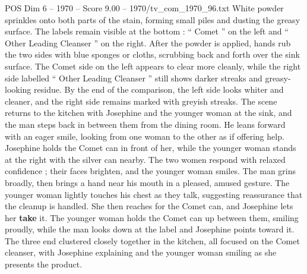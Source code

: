 \begin{textsample}{POS Dim 6 – 1970 – Score 9.00 – 1970/tv\_com\_1970\_96.txt}
White powder sprinkles onto both parts of the stain, forming small piles and dusting the greasy surface.
The labels remain visible at the bottom : “ Comet ” on the left and “ Other Leading Cleanser ” on the right.
After the powder is applied, hands rub the two sides with blue sponges or cloths, scrubbing back and forth over the sink surface.
The Comet side on the left appears to clear more cleanly, while the right side labelled “ Other Leading Cleanser ” still shows darker streaks and greasy-looking residue.
By the end of the comparison, the left side looks whiter and cleaner, and the right side remains marked with greyish streaks.
The scene returns to the kitchen with Josephine and the younger woman at the sink, and the man steps back in between them from the dining room.
He leans forward with an eager smile, looking from one woman to the other as if offering help.
Josephine holds the Comet can in front of her, while the younger woman stands at the right with the silver can nearby.
The two women respond with relaxed confidence ; their faces brighten, and the younger woman smiles.
The man grins broadly, then brings a hand near his mouth in a pleased, amused gesture.
The younger woman lightly touches his chest as they talk, suggesting reassurance that the cleanup is handled.
She then reaches for the Comet can, and Josephine lets her \textbf{take} it.
The younger woman holds the Comet can up between them, smiling proudly, while the man looks down at the label and Josephine points toward it.
The three end clustered closely together in the kitchen, all focused on the Comet cleanser, with Josephine explaining and the younger woman smiling as she presents the product.

\end{textsample}
